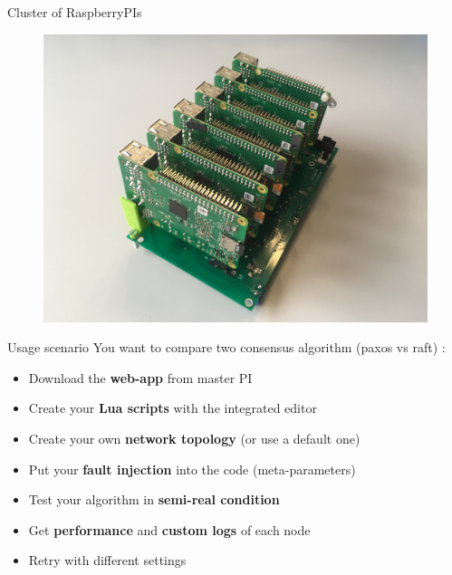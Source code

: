 \documentclass[final,hyperref={pdfpagelabels=false}]{beamer}
\begin{document}
\begin{frame}[t]
\begin{columns}[t]
\begin{column}{.465\textwidth}
\begin{block}{Cluster of RaspberryPIs}
\noindent
\begin{figure}
    \centering
    \includegraphics[scale=0.13]{rasp_stack.jpg}
\end{figure}

\end{block}

\begin{block}{Usage scenario}
You want to compare two consensus algorithm (paxos vs raft) : 
\begin{itemize}
    \item Download the \textbf{web-app} from master PI
    \item Create your \textbf{Lua scripts} with the integrated editor
    \item Create your own \textbf{network topology} (or use a default one)
    \item Put your \textbf{fault injection} into the code (meta-parameters)
    \item Test your algorithm in \textbf{semi-real condition}
    \item Get \textbf{performance} and  \textbf{custom logs} of each node
    \item Retry with different settings
\end{itemize}
\end{block}



\end{column}
\end{columns}
\end{frame}
\end{document}
